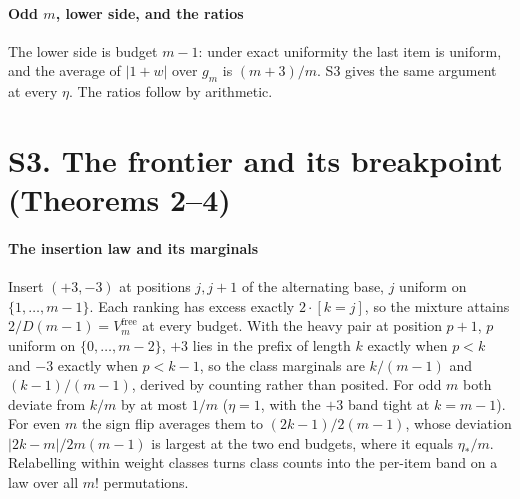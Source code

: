 
\paragraph{Odd $m$, lower side, and the ratios} The lower side is budget $m-1$: under
exact uniformity the last item is uniform, and the average of $|1+w|$ over $g_{m}$ is
$(m+3)/m$. S3 gives the same argument at every $\eta$. The ratios follow by arithmetic.


\section{S3. The frontier and its breakpoint (Theorems 2--4)}

\paragraph{The insertion law and its marginals} Insert $(+3,-3)$ at positions $j,j+1$ of
the alternating base, $j$ uniform on $\{1,\dots,m-1\}$. Each ranking has excess exactly
$2\cdot[k=j]$, so the mixture attains $2/D(m-1)=V^{\mathrm{free}}_{m}$ at every budget.
With the heavy pair at position $p+1$, $p$ uniform on $\{0,\dots,m-2\}$, $+3$ lies in the
prefix of length $k$ exactly when $p<k$ and $-3$ exactly when $p<k-1$, so the class
marginals are $k/(m-1)$ and $(k-1)/(m-1)$, derived by counting rather than posited. For odd
$m$ both deviate from $k/m$ by at most $1/m$ ($\eta=1$, with the $+3$ band tight at
$k=m-1$). For even $m$ the sign flip averages them to $(2k-1)/2(m-1)$, whose deviation
$|2k-m|/2m(m-1)$ is largest at the two end budgets, where it equals $\eta_{*}/m$. Relabelling
within weight classes turns class counts into the per-item band on a law over all $m!$
permutations.


